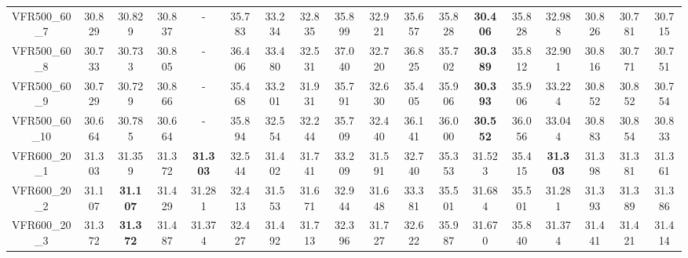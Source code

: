 \begin{tabular}{cc|ccc|ccccccccccccc}
VFR500\_60\_7      & 30.829           & 30.829           & 30.837           & -                & 35.783           & 33.234           & 32.835           & 35.899           & 32.921           & 35.657           & 35.828           & {\bf 30.406}     & 35.828           & 32.988           & 30.826           & 30.781           & 30.715          \\ 
VFR500\_60\_8      & 30.733           & 30.733           & 30.805           & -                & 36.406           & 33.480           & 32.531           & 37.040           & 32.720           & 36.825           & 35.702           & {\bf 30.389}     & 35.812           & 32.901           & 30.816           & 30.771           & 30.751          \\ 
VFR500\_60\_9      & 30.729           & 30.729           & 30.866           & -                & 35.468           & 33.201           & 31.931           & 35.791           & 32.630           & 35.405           & 35.906           & {\bf 30.393}     & 35.906           & 33.224           & 30.852           & 30.852           & 30.754          \\ 
VFR500\_60\_10     & 30.664           & 30.785           & 30.664           & -                & 35.894           & 32.554           & 32.244           & 35.709           & 32.440           & 36.141           & 36.000           & {\bf 30.552}     & 36.056           & 33.044           & 30.883           & 30.854           & 30.833          \\ 
VFR600\_20\_1      & 31.303           & 31.359           & 31.372           & {\bf 31.303}     & 32.544           & 31.402           & 31.741           & 33.209           & 31.591           & 32.740           & 35.353           & 31.523           & 35.415           & {\bf 31.303}     & 31.398           & 31.381           & 31.361          \\ 
VFR600\_20\_2      & 31.107           & {\bf 31.107}     & 31.429           & 31.281           & 32.413           & 31.553           & 31.671           & 32.944           & 31.648           & 33.381           & 35.501           & 31.684           & 35.501           & 31.281           & 31.393           & 31.389           & 31.386          \\ 
VFR600\_20\_3      & 31.372           & {\bf 31.372}     & 31.487           & 31.374           & 32.427           & 31.492           & 31.713           & 32.396           & 31.727           & 32.622           & 35.987           & 31.670           & 35.840           & 31.374           & 31.441           & 31.421           & 31.414          \\ 

\end{tabular}
